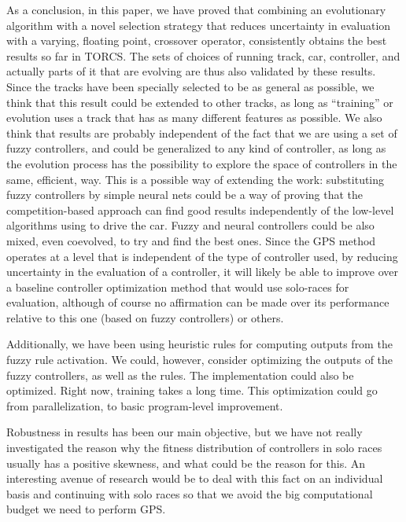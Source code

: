 \documentclass[10pt,journal,compsoc]{IEEEtran}
\begin{document}
As a conclusion, in this paper, we have proved that combining an
evolutionary algorithm with a novel selection strategy that reduces
uncertainty in evaluation with a varying, floating point,
crossover operator, consistently obtains the best results so far in
TORCS. The sets of choices of running track, car, controller, and actually parts of it that are evolving are thus also validated by
these results. Since the tracks have been specially selected to be as
general as possible, we think that this result could be extended to
other tracks, as long as ``training'' or evolution uses a track that
has as many different features as possible.
We also think that results are probably independent of the fact that
we are using a set of fuzzy controllers, and could be
generalized to any kind of controller, as long as the evolution
process has the possibility to explore the space of controllers in the
same, efficient, way. This is a possible way of extending the work:
substituting fuzzy controllers by simple neural nets could be a way of
proving that the competition-based approach can find good results
independently of the low-level algorithms using to drive the
car. Fuzzy and neural controllers could be also mixed, even coevolved,
to try and find the best ones. Since the GPS method
  operates at a level that is independent of the type of controller used, by
  reducing uncertainty in the evaluation of a controller, it will likely be able to improve over a baseline controller
  optimization method that would use solo-races for evaluation, although of course no affirmation
  can be made over its performance relative to this one (based on
  fuzzy controllers) or others.

Additionally, we have been using heuristic rules for computing outputs
from the fuzzy rule activation. We could, however, consider optimizing
the outputs of the fuzzy controllers, as well as the rules. The implementation could also be optimized. Right now, training takes
a long time. This optimization could go from parallelization, to basic
program-level improvement.

Robustness in results has been our main objective, but
  we have not really investigated the reason why the fitness
  distribution of controllers in solo races usually has a positive
  skewness, and what could be the reason for this. An interesting
  avenue of research would be to deal with this fact on an individual
  basis and continuing with solo races so that we avoid the big   computational budget we need to perform GPS.
\end{document}
